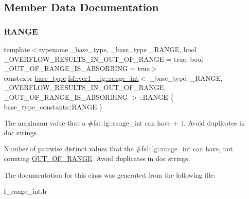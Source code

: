 \subsection{Member Data Documentation}
\mbox{\label{classfsl_1_1ver1__0_1_1lg_1_1range__int_a48e6f92039600251a43bd027a8a5aa10}} 
\subsubsection{\texorpdfstring{RANGE}{RANGE}}
{\footnotesize\ttfamily template$<$typename \+\_\+base\+\_\+type, \+\_\+base\+\_\+type \+\_\+\+R\+A\+N\+GE, bool \+\_\+\+O\+V\+E\+R\+F\+L\+O\+W\+\_\+\+R\+E\+S\+U\+L\+T\+S\+\_\+\+I\+N\+\_\+\+O\+U\+T\+\_\+\+O\+F\+\_\+\+R\+A\+N\+GE = true, bool \+\_\+\+O\+U\+T\+\_\+\+O\+F\+\_\+\+R\+A\+N\+G\+E\+\_\+\+I\+S\+\_\+\+A\+B\+S\+O\+R\+B\+I\+NG = true$>$ \\
constexpr \mbox{\hyperlink{classfsl_1_1ver1__0_1_1lg_1_1range__int_af14c814b65a761cd387e7577eb2ef78c}{base\+\_\+type}} \mbox{\hyperlink{classfsl_1_1ver1__0_1_1lg_1_1range__int}{fsl\+::ver1\+\_\+::lg\+::range\+\_\+int}}$<$ \+\_\+base\+\_\+type, \+\_\+\+R\+A\+N\+GE, \+\_\+\+O\+V\+E\+R\+F\+L\+O\+W\+\_\+\+R\+E\+S\+U\+L\+T\+S\+\_\+\+I\+N\+\_\+\+O\+U\+T\+\_\+\+O\+F\+\_\+\+R\+A\+N\+GE, \+\_\+\+O\+U\+T\+\_\+\+O\+F\+\_\+\+R\+A\+N\+G\+E\+\_\+\+I\+S\+\_\+\+A\+B\+S\+O\+R\+B\+I\+NG $>$\+::R\+A\+N\+GE \{ base\+\_\+type\+\_\+constants\+::\+R\+A\+N\+GE \}\hspace{0.3cm}{\ttfamily [static]}}



The maximum value that a \#fsl\+::lg\+::range\+\_\+int can have + 1. Avoid duplicates in doc strings. 

Number of pairwise distinct values that the \#fsl\+::lg\+::range\+\_\+int can have, not counting \mbox{\hyperlink{classfsl_1_1ver1__0_1_1lg_1_1range__int_a690eec0614992c007017ea852bb58210}{O\+U\+T\+\_\+\+O\+F\+\_\+\+R\+A\+N\+GE}}. Avoid duplicates in doc strings. 

The documentation for this class was generated from the following file\+:\begin{DoxyCompactItemize}
\item 
f\+\_\+range\+\_\+int.\+h\end{DoxyCompactItemize}
